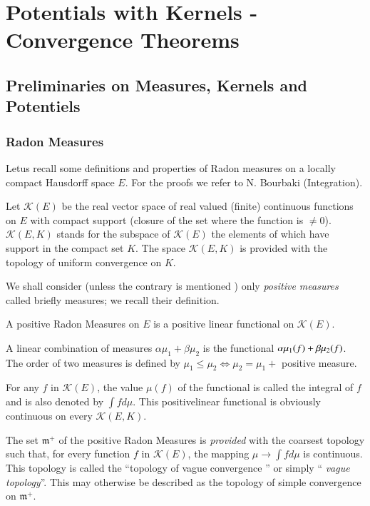 \part{Potentials with Kernels - Convergence Theorems}\label{p3}%

\setcounter{chapter}{0}
\chapter{Preliminaries on Measures, Kernels and
  Potentiels}\label{p3:chap1}%

\section{Radon Measures}\label{p3:chap1:sec1} %

Let\pageoriginale us recall some definitions and properties of Radon measures on a
locally compact Hausdorff space $E$. For the proofs we refer to
N. Bourbaki (Integration). 

Let $\mathcal{K}(E)$ be the real vector space of real valued (finite)
continuous functions on $E$ with compact support (closure of the set
where the function is $\neq 0$). $\mathcal{K}(E, K)$ stands for the
subspace of $\mathcal{K}(E)$ the elements of which have support in the
compact set $K$. The space $\mathcal{K}(E, K)$ is provided with the
topology of uniform convergence on $K$. 

We shall consider (unless the contrary is mentioned ) only
\textit{positive measures} called briefly measures; we recall their
definition. 

\setcounter{defn}{0}
\begin{defn}\label{p3:chap1:sec1:def1}%
  A positive Radon Measures on $E$ is a positive linear functional  on
  $\mathcal{K}(E)$. 
\end{defn}

A linear combination of measures $\alpha \mu_1 + \beta \mu_2$ is the
functional $\alpha \mu_1\break (f) + \beta \mu_2 (f)$. The order of two
measures is defined by $\mu_1 \le \mu_2 \Longleftrightarrow \mu_2 =
\mu_1 + $ positive measure. 

For any $f$ in $\mathcal{K}(E)$, the value $\mu (f)$ of the functional
is called the integral of $f$ and is also denoted by $\int f d
\mu$. This positive\pageoriginale linear functional is obviously continuous on every
$\mathcal{K} (E, K)$. 

The set $\mathfrak{m}^+$ of the positive Radon Measures is
\textit{provided} with the coarsest topology such that, for every
function $f$ in $\mathcal{K}(E)$, the mapping $\mu \to \int f d \mu$ is
continuous. This topology is called the ``topology of vague convergence
'' or simply ``\textit{ vague topology}''. This may otherwise be
described as the topology of simple convergence on $\mathfrak{m}^+$. 

